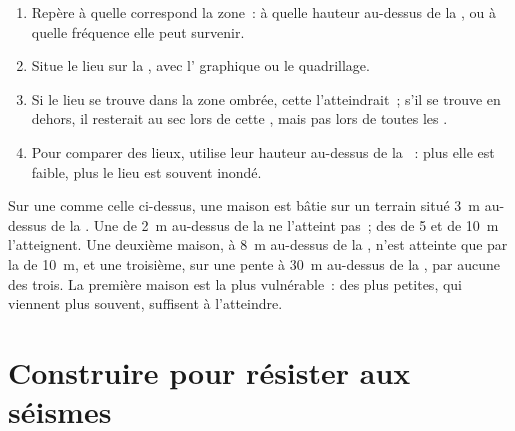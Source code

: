 \begin{method}
\begin{enumerate}
  \item Repère à quelle  correspond la zone~: à quelle hauteur
        au-dessus de la , ou à quelle fréquence elle peut survenir.
  \item Situe le lieu sur la , avec l' graphique ou le
        quadrillage.
  \item Si le lieu se trouve dans la zone ombrée, cette 
        l'atteindrait~; s'il se trouve en dehors, il resterait au sec lors
        de cette , mais pas lors de toutes les .
  \item Pour comparer des lieux, utilise leur hauteur au-dessus de la
        ~: plus elle est faible, plus le lieu est souvent inondé.
\end{enumerate}
\end{method}

\begin{example}
Sur une  comme celle ci-dessus, une maison est bâtie sur un terrain
situé \qty{3}{m} au-dessus de la . Une  de \qty{2}{m}
au-dessus de la  ne l'atteint pas~; des  de 5 et de
\qty{10}{m} l'atteignent. Une deuxième maison, à \qty{8}{m} au-dessus de
la , n'est atteinte que par la  de \qty{10}{m}, et une
troisième, sur une pente à \qty{30}{m} au-dessus de la , par
aucune des trois. La première maison est la plus vulnérable~: des 
plus petites, qui viennent plus souvent, suffisent à l'atteindre.
\end{example}

\section{Construire pour résister aux séismes}

